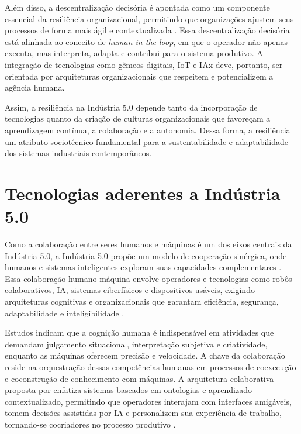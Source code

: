 Além disso, a descentralização decisória é apontada como um componente essencial da resiliência organizacional, permitindo que organizações ajustem seus processos de forma mais ágil e contextualizada \cite{PIZON2023, Nahavandi2019}. Essa descentralização decisória está alinhada ao conceito de \textit{human-in-the-loop}, em que o operador não apenas executa, mas interpreta, adapta e contribui para o sistema produtivo. A integração de tecnologias como gêmeos digitais, \gls{IoT} e \gls{IAx} deve, portanto, ser orientada por arquiteturas organizacionais que respeitem e potencializem a agência humana.

Assim, a resiliência na Indústria 5.0 depende tanto da incorporação de tecnologias quanto da criação de culturas organizacionais que favoreçam a aprendizagem contínua, a colaboração e a autonomia. Dessa forma, a resiliência um atributo sociotécnico fundamental para a sustentabilidade e adaptabilidade dos sistemas industriais contemporâneos.

\section{Tecnologias aderentes a Indústria 5.0}

Como a colaboração entre seres humanos e máquinas é um dos eixos centrais da Indústria 5.0,  a Indústria 5.0 propõe um modelo de cooperação sinérgica, onde humanos e sistemas inteligentes exploram suas capacidades complementares \cite{Nahavandi2019, Santana_2023}. Essa colaboração humano-máquina envolve operadores e tecnologias como robôs colaborativos, \gls{IA}, sistemas ciberfísicos e dispositivos usáveis, exigindo arquiteturas cognitivas e organizacionais que garantam eficiência, segurança, adaptabilidade e inteligibilidade \cite{TOTH2023, PIZON2023}.

Estudos indicam que a cognição humana é indispensável em atividades que demandam julgamento situacional, interpretação subjetiva e criatividade, enquanto as máquinas oferecem precisão e velocidade. A chave da colaboração reside na orquestração dessas competências humanas em processos de coexecução e coconstrução de conhecimento \cite{TOTH2023} com máquinas. A arquitetura colaborativa proposta por  enfatiza sistemas baseados em ontologias e aprendizado contextualizado, permitindo que operadores interajam com interfaces amigáveis, tomem decisões assistidas por \gls{IA} e personalizem sua experiência de trabalho, tornando-se cocriadores no processo produtivo \cite{TOTH2023, YANG2024}.

